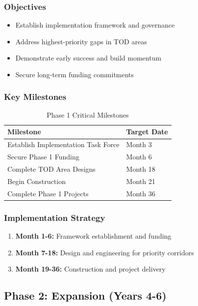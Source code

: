 \documentclass[11pt,letterpaper]{article}
\begin{document}
\subsubsection{Objectives}
\begin{itemize}
    \item Establish implementation framework and governance
    \item Address highest-priority gaps in TOD areas
    \item Demonstrate early success and build momentum
    \item Secure long-term funding commitments
\end{itemize}

\subsubsection{Key Milestones}
\begin{table}[h]
\centering
\caption{Phase 1 Critical Milestones}
\begin{tabular}{ll}
\toprule
\textbf{Milestone} & \textbf{Target Date} \\
\midrule
Establish Implementation Task Force & Month 3 \\
Secure Phase 1 Funding & Month 6 \\
Complete TOD Area Designs & Month 18 \\
Begin Construction & Month 21 \\
Complete Phase 1 Projects & Month 36 \\
\bottomrule
\end{tabular}
\end{table}

\subsubsection{Implementation Strategy}
\begin{enumerate}
    \item \textbf{Month 1-6:} Framework establishment and funding
    \item \textbf{Month 7-18:} Design and engineering for priority corridors
    \item \textbf{Month 19-36:} Construction and project delivery
\end{enumerate}

\subsection{Phase 2: Expansion (Years 4-6)}
\end{document}
